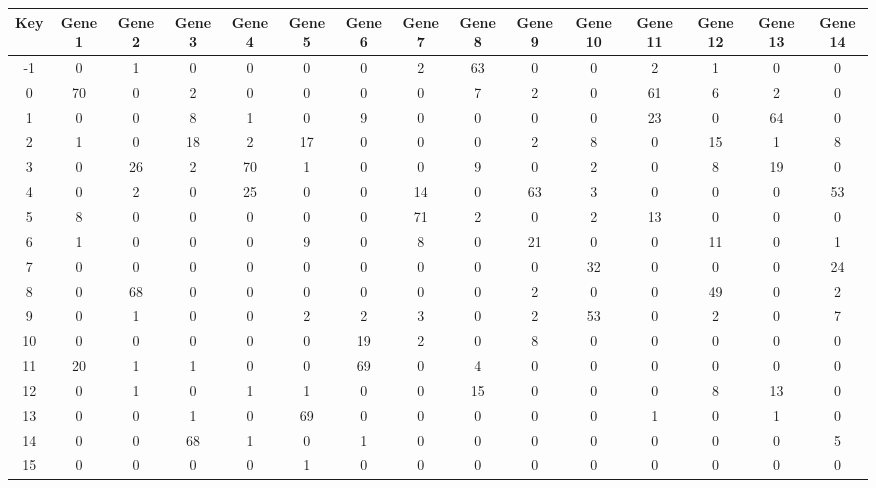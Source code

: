 \begin{tabular}{|c|c|c|c|c|c|c|c|c|c|c|c|c|c|c|}
\hline
Key & Gene 1 & Gene 2 & Gene 3 & Gene 4 & Gene 5 & Gene 6 & Gene 7 & Gene 8 & Gene 9 & Gene 10 & Gene 11 & Gene 12 & Gene 13 & Gene 14 \\
\hline
-1 & 0 & 1 & 0 & 0 & 0 & 0 & 2 & 63 & 0 & 0 & 2 & 1 & 0 & 0 \\
0 & 70 & 0 & 2 & 0 & 0 & 0 & 0 & 7 & 2 & 0 & 61 & 6 & 2 & 0 \\
1 & 0 & 0 & 8 & 1 & 0 & 9 & 0 & 0 & 0 & 0 & 23 & 0 & 64 & 0 \\
2 & 1 & 0 & 18 & 2 & 17 & 0 & 0 & 0 & 2 & 8 & 0 & 15 & 1 & 8 \\
3 & 0 & 26 & 2 & 70 & 1 & 0 & 0 & 9 & 0 & 2 & 0 & 8 & 19 & 0 \\
4 & 0 & 2 & 0 & 25 & 0 & 0 & 14 & 0 & 63 & 3 & 0 & 0 & 0 & 53 \\
5 & 8 & 0 & 0 & 0 & 0 & 0 & 71 & 2 & 0 & 2 & 13 & 0 & 0 & 0 \\
6 & 1 & 0 & 0 & 0 & 9 & 0 & 8 & 0 & 21 & 0 & 0 & 11 & 0 & 1 \\
7 & 0 & 0 & 0 & 0 & 0 & 0 & 0 & 0 & 0 & 32 & 0 & 0 & 0 & 24 \\
8 & 0 & 68 & 0 & 0 & 0 & 0 & 0 & 0 & 2 & 0 & 0 & 49 & 0 & 2 \\
9 & 0 & 1 & 0 & 0 & 2 & 2 & 3 & 0 & 2 & 53 & 0 & 2 & 0 & 7 \\
10 & 0 & 0 & 0 & 0 & 0 & 19 & 2 & 0 & 8 & 0 & 0 & 0 & 0 & 0 \\
11 & 20 & 1 & 1 & 0 & 0 & 69 & 0 & 4 & 0 & 0 & 0 & 0 & 0 & 0 \\
12 & 0 & 1 & 0 & 1 & 1 & 0 & 0 & 15 & 0 & 0 & 0 & 8 & 13 & 0 \\
13 & 0 & 0 & 1 & 0 & 69 & 0 & 0 & 0 & 0 & 0 & 1 & 0 & 1 & 0 \\
14 & 0 & 0 & 68 & 1 & 0 & 1 & 0 & 0 & 0 & 0 & 0 & 0 & 0 & 5 \\
15 & 0 & 0 & 0 & 0 & 1 & 0 & 0 & 0 & 0 & 0 & 0 & 0 & 0 & 0 \\
\hline
\end{tabular}